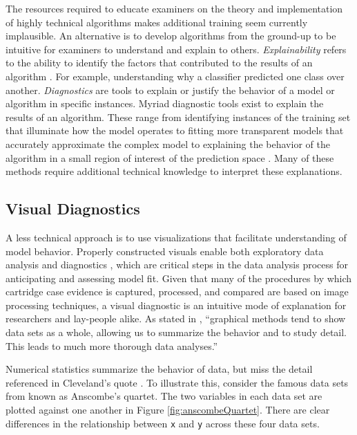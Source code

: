 \documentclass[11pt,]{isuthesis}
\begin{document}
The resources required to educate examiners on the theory and implementation of highly technical algorithms makes additional training seem currently implausible.
An alternative is to develop algorithms from the ground-up to be intuitive for examiners to understand and explain to others.
\emph{Explainability} refers to the ability to identify the factors that contributed to the results of an algorithm \citep{Belle2021PrinciplesAP}.
For example, understanding why a classifier predicted one class over another.
\emph{Diagnostics} are tools to explain or justify the behavior of a model or algorithm in specific instances.
Myriad diagnostic tools exist to explain the results of an algorithm.
These range from identifying instances of the training set that illuminate how the model operates \citep{Deng2018} to fitting more transparent models that accurately approximate the complex model \citep{Puiutta2020} to explaining the behavior of the algorithm in a small region of interest of the prediction space \citep{LIME, Goode2021}.
Many of these methods require additional technical knowledge to interpret these explanations.

\hypertarget{visual-diagnostics}{%
\subsection{Visual Diagnostics}\label{visual-diagnostics}}

A less technical approach is to use visualizations that facilitate understanding of model behavior.
Properly constructed visuals enable both exploratory data analysis and diagnostics \citep{Buja2009}, which are critical steps in the data analysis process for anticipating and assessing model fit.
Given that many of the procedures by which cartridge case evidence is captured, processed, and compared are based on image processing techniques, a visual diagnostic is an intuitive mode of explanation for researchers and lay-people alike.
As stated in \citet{cleveland1994elements}, ``graphical methods tend to show data sets as a whole, allowing us to summarize the behavior and to study detail. This leads to much more thorough data analyses.''

Numerical statistics summarize the behavior of data, but miss the detail referenced in Cleveland's quote \citep{telea2014data}.
To illustrate this, consider the famous data sets from \citep{Anscombe1973} known as Anscombe's quartet.
The two variables in each data set are plotted against one another in Figure \ref{fig:anscombeQuartet}.
There are clear differences in the relationship between \texttt{x} and \texttt{y} across these four data sets.
\end{document}
